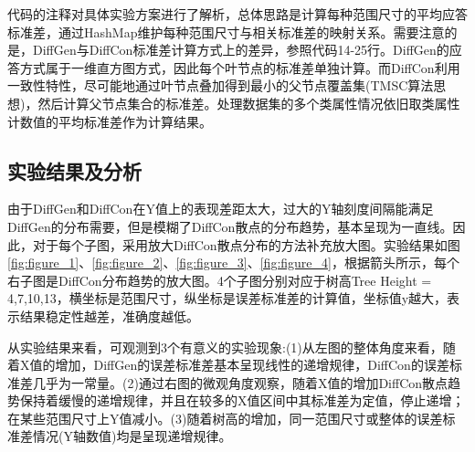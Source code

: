代码的注释对具体实验方案进行了解析，总体思路是计算每种范围尺寸的平均应答标准差，通过HashMap维护每种范围尺寸与相关标准差的映射关系。需要注意的是，DiffGen与DiffCon标准差计算方式上的差异，参照代码14-25行。DiffGen的应答方式属于一维直方图方式，因此每个叶节点的标准差单独计算。而DiffCon利用一致性特性，尽可能地通过叶节点叠加得到最小的父节点覆盖集(TMSC算法思想)，然后计算父节点集合的标准差。处理数据集的多个类属性情况依旧取类属性计数值的平均标准差作为计算结果。


\subsection{实验结果及分析}


由于DiffGen和DiffCon在Y值上的表现差距太大，过大的Y轴刻度间隔能满足DiffGen的分布需要，但是模糊了DiffCon散点的分布趋势，基本呈现为一直线。因此，对于每个子图，采用放大DiffCon散点分布的方法补充放大图。实验结果如图\ref{fig:figure_1}、\ref{fig:figure_2}、\ref{fig:figure_3}、\ref{fig:figure_4}，根据箭头所示，每个右子图是DiffCon分布趋势的放大图。4个子图分别对应于树高Tree Height = 4,7,10,13，横坐标是范围尺寸，纵坐标是误差标准差的计算值，坐标值y越大，表示结果稳定性越差，准确度越低。

从实验结果来看，可观测到3个有意义的实验现象:(1)从左图的整体角度来看，随着X值的增加，DiffGen的误差标准差基本呈现线性的递增规律，DiffCon的误差标准差几乎为一常量。(2)通过右图的微观角度观察，随着X值的增加DiffCon散点趋势保持着缓慢的递增规律，并且在较多的X值区间中其标准差为定值，停止递增；在某些范围尺寸上Y值减小。(3)随着树高的增加，同一范围尺寸或整体的误差标准差情况(Y轴数值)均是呈现递增规律。

